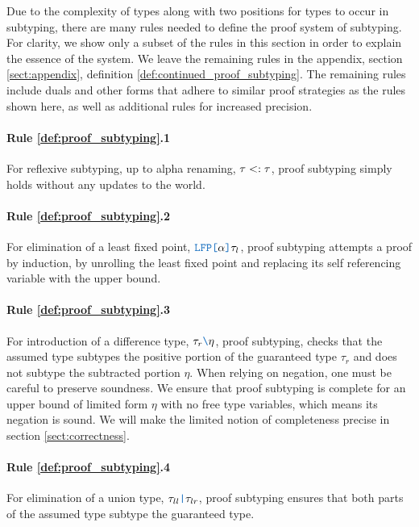 \documentclass[acmsmall]{acmart}
\theoremstyle{definition}
\begin{document}
Due to the complexity of types along with two positions for types to occur in subtyping,
there are many rules needed to define the proof system of subtyping. For clarity,
we show only a subset of the rules in this section in order to explain the essence of the system.
We leave the remaining rules in the appendix, section \ref{sect:appendix}, definition \ref{def:continued_proof_subtyping}. 
The remaining rules include duals and other forms that adhere to similar proof strategies as the rules shown here,
as well as additional rules for increased precision.  


\paragraph{Rule \ref{def:proof_subtyping}.1}
For reflexive subtyping, up to alpha renaming, $\tau <: \tau$, 
proof subtyping simply holds without any updates to the world.

\paragraph{Rule \ref{def:proof_subtyping}.2}
For elimination of a least fixed point, $\obj{LFP[} \alpha \obj{]} \tau_l$, proof subtyping  
attempts a proof by induction, by unrolling the least fixed point
and replacing its self referencing variable with the upper bound.

\paragraph{Rule \ref{def:proof_subtyping}.3}
For introduction of a difference type, $\tau_r\obj{\textbackslash}\eta$, proof subtyping,
checks that the assumed type subtypes the positive portion of the guaranteed type $\tau_r$
and does not subtype the subtracted portion $\eta$.
When relying on negation, one must be careful to preserve soundness.
We ensure that proof subtyping is complete for an upper bound of limited
form $\eta$ with no free type variables, which
means its negation is sound. We will make the limited notion
of completeness precise in section \ref{sect:correctness}.

\paragraph{Rule \ref{def:proof_subtyping}.4}
For elimination of a union type, $\tau_{ll}\obj{|}\tau_{lr}$, proof subtyping
ensures that both parts of the assumed type subtype the guaranteed type.
\end{document}
